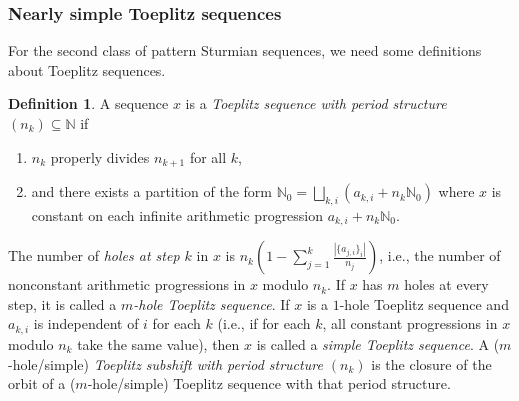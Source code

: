 \documentclass[11pt,reqno]{amsart}
\theoremstyle{definition}
\newtheorem{definition}[theorem]{Definition}
\theoremstyle{plain}
\newcommand{\N}{\mathbb{N}}
\newcommand{\AuthornoteR}[2]{{\sf\small\color{blue}{[#1: #2]}}}
\newcommand{\AuthornoteC}[2]{{\sf\small\color{cyan}{[#1: #2]}}}
\newcommand{\rp}{\AuthornoteR{R}}
\newcommand{\Cnote}{\AuthornoteC{C}}
\begin{document}




\subsubsection{Nearly simple Toeplitz sequences}

For the second class of pattern Sturmian sequences, we need some definitions about Toeplitz sequences.

\begin{definition}
A sequence $x$ is a \emph{Toeplitz sequence with period structure $(n_k) \subseteq \N$} if 
\begin{enumerate}
    \item $n_k$ properly divides $n_{k+1}$ for all $k$,
    
    \item and there exists a partition of the form $\N_0 = \bigsqcup_{k,i} (a_{k,i} + n_k \N_0)$ where $x$ is constant on each infinite arithmetic progression $a_{k,i} + n_k \N_0$. 
\end{enumerate}
The number of \emph{holes at step $k$} in $x$ is $n_k \left(1 - \sum_{j = 1}^k \frac{|\{a_{j,i}\}_i|}{n_j}\right)$, i.e., the number of nonconstant arithmetic progressions in $x$ modulo $n_k$. If $x$ has $m$ holes at every step, it is called a \emph{$m$-hole Toeplitz sequence}. If $x$ is a $1$-hole Toeplitz sequence and $a_{k,i}$ is independent of $i$ for each $k$ (i.e., if for each $k$, all constant progressions in $x$ modulo $n_k$ take the same value), then $x$ is called a \emph{simple Toeplitz sequence}.
A ($m$-hole/simple) \emph{Toeplitz subshift with period structure $(n_k)$} is the closure of the orbit of a ($m$-hole/simple) Toeplitz sequence with that period structure.
\end{definition}
\end{document}
